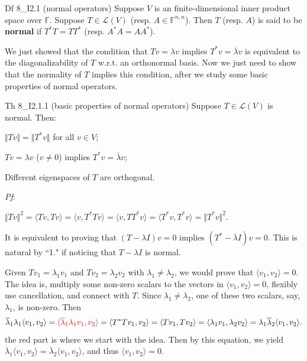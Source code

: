 \documentclass{article}
\begin{document}
\begin{Df}{Df 8\_I2.1 (normal operators)}
    Suppose $V$ is an finite-dimensional inner product space over $\mathbb{F}$. Suppose $T\in\mathcal{L}(V)$ (resp. $A\in\mathbb{F}^{n, n}$). Then $T$ (resp. $A$) is said to be \textbf{normal} if $T^*T = TT^*$ (resp. $A^*A = AA^*$).
\end{Df}

We just showed that the condition that $Tv = \lambda v$ implies $T^*v = \overline{\lambda}v$ is equivalent to the diagonalizability of $T$ w.r.t. an orthonormal basis. Now we just need to show that the normality of $T$ implies this condition, after we study some basic properties of normal operators.

\begin{Th}{Th 8\_I2.1.1 (basic properties of normal operators)}
    Suppose $T\in\mathcal{L}(V)$ is normal. Then:
    \begin{compactenum}
        \item $\Vert Tv\Vert = \Vert T^*v\Vert$ for all $v\in V$;
        \item $Tv = \lambda v$ ($v\neq 0$) implies $T^*v = \overline{\lambda}v$;
        \item Different eigenspaces of $T$ are orthogonal.
    \end{compactenum}
    \tcblower
    \textit{Pf}:
    \begin{compactenum}
        \item $\Vert Tv\Vert^2 = \langle Tv, Tv\rangle = \langle v, T^*Tv\rangle = \langle v, TT^*v\rangle = \langle T^*v, T^*v\rangle = \Vert T^*v\Vert^2$.
        \item It is equivalent to proving that $(T-\lambda I)v = 0$ implies $(T^*-\overline{\lambda}I)v = 0$. This is natural by ``1." if noticing that $T-\lambda I$ is normal.
        \item Given $Tv_1 = \lambda_1v_1$ and $Tv_2 = \lambda_2v_2$ with $\lambda_1\neq\lambda_2$, we would prove that $\langle v_1, v_2\rangle = 0$. The idea is, multiply some non-zero scalars to the vectors in $\langle v_1, v_2\rangle = 0$, flexibly use cancellation, and connect with $T$. Since $\lambda_1\neq\lambda_2$, one of these two scalars, say, $\lambda_1$, is non-zero. Then 
        $$ \overline{\lambda}_1\lambda_1\langle v_1, v_2\rangle = \textcolor{red}{\langle \overline{\lambda}_1\lambda_1v_1, v_2\rangle} = \langle T^*Tv_1, v_2\rangle = \langle Tv_1, Tv_2\rangle = \langle \lambda_1v_1, \lambda_2v_2\rangle = \lambda_1\overline{\lambda}_2\langle v_1, v_2\rangle. $$
        the red part is where we start with the idea. Then by this equation, we yield $\overline{\lambda}_1\langle v_1, v_2\rangle = \overline{\lambda}_2\langle v_1, v_2\rangle$, and thus $\langle v_1, v_2\rangle = 0$.
    \end{compactenum}
\end{Th}
\end{document}
